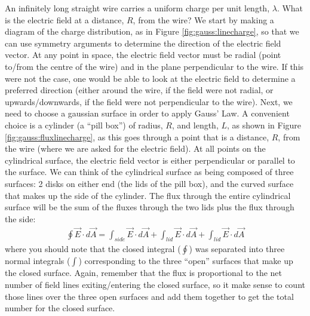 \begin{example}{An infinitely long straight wire carries a uniform charge per unit length, $\lambda$. What is the electric field at a distance, $R$, from the wire?}
We start by making a diagram of the charge distribution, as in Figure \ref{fig:gauss:linecharge}, so that we can use symmetry arguments to determine the direction of the electric field vector. At any point in space, the electric field vector must be radial (point to/from the centre of the wire) and in the plane perpendicular to the wire. If this were not the case, one would be able to look at the electric field to determine a preferred direction (either around the wire, if the field were not radial, or upwards/downwards, if the field were not perpendicular to the wire). 
Next, we need to choose a gaussian surface in order to apply Gauss' Law. A convenient choice is a cylinder (a ``pill box'') of radius, $R$, and length, $L$, as shown in Figure \ref{fig:gauss:fluxlinecharge}, as this goes through a point that is a distance, $R$, from the wire (where we are asked for the electric field). At all points on the cylindrical surface, the electric field vector is either perpendicular or parallel to the surface.
We can think of the cylindrical surface as being composed of three surfaces: 2 disks on either end (the lids of the pill box), and the curved surface that makes up the side of the cylinder. The flux through the entire cylindrical surface will be the sum of the fluxes through the two lids plus the flux through the side:
\begin{align*}
\oint \vec E\cdot d\vec A = \int_{side} \vec E\cdot d\vec A + \int_{lid}\vec E\cdot d\vec A + \int_{lid}\vec E\cdot d\vec A
\end{align*}
where you should note that the closed integral ($\oint$) was separated into three normal integrals ($\int$) corresponding to the three ``open'' surfaces that make up the closed surface. Again, remember that the flux is proportional to the net number of field lines exiting/entering the closed surface, so it make sense to count those lines over the three open surfaces and add them together to get the total number for the closed surface.


\end{example}
